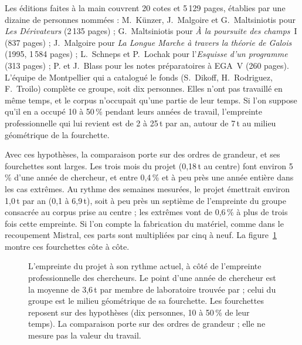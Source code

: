 \documentclass[11pt,a4paper]{article}
\newcommand{\rangerow}[5]{%
  \draw[rangefill, line width=7pt] (axis cs:#2,#1) -- (axis cs:#3,#1);
  \if\relax\detokenize{#4}\relax\else\fill[markblue] (axis cs:#4,#1) circle (2.6pt);\fi
  \node[anchor=west, font=\footnotesize, inner sep=3pt] at (axis cs:#3,#1) {#5};}
\begin{document}
Les éditions faites à la main couvrent 20 cotes et 5\,129 pages, établies par une dizaine de personnes nommées : M.~Künzer, J.~Malgoire et G.~Maltsiniotis pour \emph{Les Dérivateurs} (2\,135 pages) ; G.~Maltsiniotis pour \emph{À la poursuite des champs}~I (837 pages) ; J.~Malgoire pour \emph{La Longue Marche à travers la théorie de Galois} (1995, 1\,584 pages) ; L.~Schneps et P.~Lochak pour l'\emph{Esquisse d'un programme} (313 pages) ; P. et J.~Blass pour les notes préparatoires à EGA~V (260 pages). L'équipe de Montpellier qui a catalogué le fonds (S.~Dikoff, H.~Rodriguez, F.~Troilo) complète ce groupe, soit dix personnes. Elles n'ont pas travaillé en même temps, et le corpus n'occupait qu'une partie de leur temps. Si l'on suppose qu'il en a occupé 10 à 50\,\% pendant leurs années de travail, l'empreinte professionnelle qui lui revient est de 2 à 25\,t par an, autour de 7\,t au milieu géométrique de la fourchette.

Avec ces hypothèses, la comparaison porte sur des ordres de grandeur, et ses fourchettes sont larges. Les trois mois du projet (0,18\,t au centre) font environ 5\,\% d'une année de chercheur, et entre 0,4\,\% et à peu près une année entière dans les cas extrêmes. Au rythme des semaines mesurées, le projet émettrait environ 1,0\,t par an (0,1 à 6,9\,t), soit à peu près un septième de l'empreinte du groupe consacrée au corpus prise au centre ; les extrêmes vont de 0,6\,\% à plus de trois fois cette empreinte. Si l'on compte la fabrication du matériel, comme dans le recoupement Mistral, ces parts sont multipliées par cinq à neuf. La figure~\ref{fig:echelle} montre ces fourchettes côte à côte.

\begin{figure}[h]\centering
{}
\caption{L'empreinte du projet à son rythme actuel, à côté de l'empreinte professionnelle des chercheurs. Le point d'une année de chercheur est la moyenne de 3,6\,t par membre de laboratoire trouvée par \citet{mariette2022} ; celui du groupe est le milieu géométrique de sa fourchette. Les fourchettes reposent sur des hypothèses (dix personnes, 10 à 50\,\% de leur temps). La comparaison porte sur des ordres de grandeur ; elle ne mesure pas la valeur du travail.}\label{fig:echelle}
\end{figure}
\end{document}
